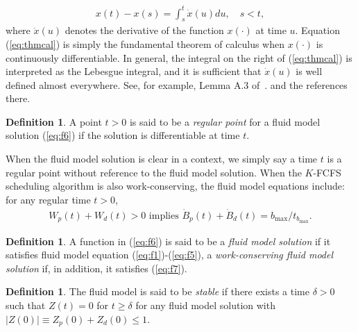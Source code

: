 \documentclass[11pt]{article}
\theoremstyle{plain}
\theoremstyle{definition}
\newtheorem{definition}[theorem]{Definition}
\theoremstyle{remark}
\providecommand{\abs}[1]{\lvert#1\rvert}
\begin{document}
\begin{align}\label{eq:thmcal}
  x(t) -x(s) = \int_s^t \dot x(u)du, \quad s< t,
\end{align}
where $\dot x(u)$ denotes the derivative of the function $x(\cdot)$ at time $u$.
Equation (\ref{eq:thmcal}) is simply the fundamental theorem of calculus when $x(\cdot)$ is continuously differentiable. In general,
the integral on the right of (\ref{eq:thmcal}) is interpreted as the Lebesgue integral, and it is sufficient that  $\dot x(u)$ is well defined almost everywhere. See, for example,
Lemma A.3 of~\citep{dai2020processing}. and the references there.
\begin{definition}
  A point $t>0$ is said to be a \textit{regular point} for a fluid model solution (\ref{eq:f6}) if the
  solution is differentiable at time $t$. 
\end{definition}
 When the fluid model solution is clear in a context, we simply say a time $t$ is a regular point without reference to the fluid model solution.
When the $K$-FCFS scheduling algorithm  is also work-conserving, the fluid model equations include: for any regular time $t>0$,
\begin{align}\label{eq:f7}
  W_p(t)+W_d(t) >0 \text{ implies } \dot B_p(t) + \dot B_d(t) = b_{\max}/t_{b_{\max}}.
\end{align}

\begin{definition}
  A function in (\ref{eq:f6}) is said to be a  \textit{fluid model solution} if it satisfies fluid model equation (\ref{eq:f1})-(\ref{eq:f5}),
  a \textit{work-conserving fluid model solution} if, in addition, it
  satisfies (\ref{eq:f7}).
\end{definition}

\begin{definition}\label{def:fm-stable}
  The fluid model is said to be \textit{stable}
if there exists a time $\delta>0$  such that
  $Z(t)=0$ for $t\ge \delta$  for any fluid model solution with $\abs{Z(0)}\equiv Z_p(0)+Z_d(0)\le 1$.
\end{definition}
\end{document}
